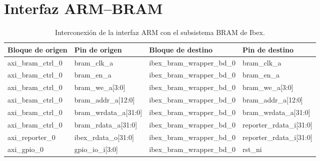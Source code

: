 \section{Interfaz ARM--BRAM}
\begin{table}[!ht]
    \centering
    \caption{Interconexión de la interfaz ARM con el subsistema BRAM de Ibex.}
    \label{tab:arm_bram}
    \begin{tabular}{|l|l|l|l|}
    \hline
        Bloque de origen        & Pin de origen         & Bloque de destino          & Pin de destino           \\ \hline
        axi\_bram\_ctrl\_0      & bram\_clk\_a          & ibex\_bram\_wrapper\_bd\_0 & bram\_clk\_a             \\ \hline
        axi\_bram\_ctrl\_0      & bram\_en\_a           & ibex\_bram\_wrapper\_bd\_0 & bram\_en\_a              \\ \hline
        axi\_bram\_ctrl\_0      & bram\_we\_a[3:0]      & ibex\_bram\_wrapper\_bd\_0 & bram\_we\_a[3:0]         \\ \hline
        axi\_bram\_ctrl\_0      & bram\_addr\_a[12:0]   & ibex\_bram\_wrapper\_bd\_0 & bram\_addr\_a[12:0]      \\ \hline
        axi\_bram\_ctrl\_0      & bram\_wrdata\_a[31:0] & ibex\_bram\_wrapper\_bd\_0 & bram\_wrdata\_a[31:0]    \\ \hline
        axi\_bram\_ctrl\_0      & bram\_rdata\_a[31:0]  & ibex\_bram\_wrapper\_bd\_0 & reporter\_rdata\_i[31:0] \\ \hline
        axi\_reporter\_0        & ibex\_rdata\_o[31:0]  & ibex\_bram\_wrapper\_bd\_0 & reporter\_rdata\_i[31:0] \\ \hline
        axi\_gpio\_0            & gpio\_io\_i[3:0]      & ibex\_bram\_wrapper\_bd\_0 & rst\_ni                  \\ \hline
    \end{tabular}
\end{table}

